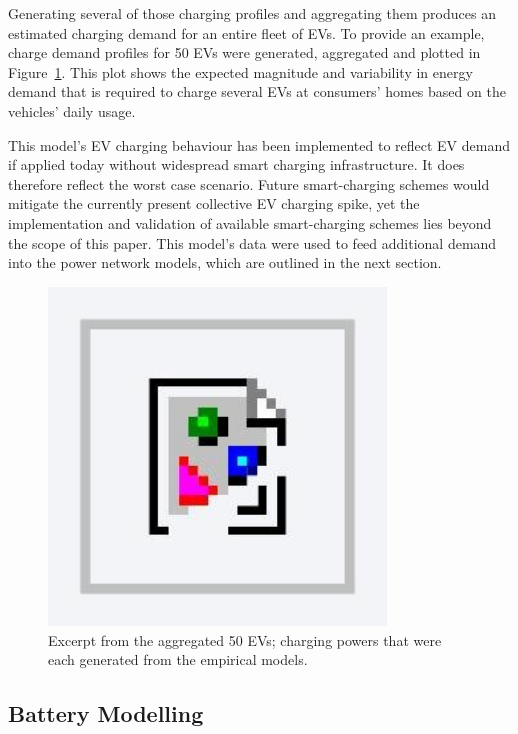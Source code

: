 Generating several of those charging profiles and aggregating them produces an estimated charging demand for an entire fleet of EVs. To provide an example, charge demand profiles for 50 EVs were generated, aggregated and plotted in Figure~\ref{fig-aggregated-ev-power}. This plot shows the expected magnitude and variability in energy demand that is required to charge several EVs at consumers' homes based on the vehicles' daily usage.

This model's EV charging behaviour has been implemented to reflect EV demand if applied today without widespread smart charging infrastructure. It does therefore reflect the worst case scenario. Future smart-charging schemes would mitigate the currently present collective EV charging spike, yet the implementation and validation of available smart-charging schemes lies beyond the scope of this paper. This model's data were used to feed additional demand into the power network models, which are outlined in the next section.

\begin{figure}\centering
 \includegraphics[width=0.8\textwidth]{foo}
 \caption{Excerpt from the aggregated 50 EVs; charging powers that were each generated from the empirical models.}
 \label{fig-aggregated-ev-power}
\end{figure}

\subsection{Battery Modelling}

